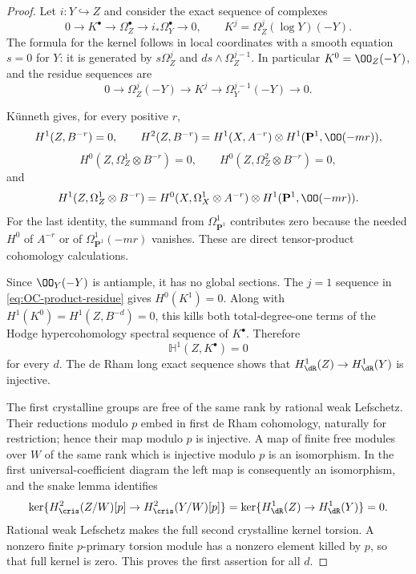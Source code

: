 \begin{proof}
Let $i:Y\hookrightarrow Z$ and consider the exact sequence of complexes
\[
 0\longrightarrow K^\bullet
 \longrightarrow\Omega_Z^\bullet
 \longrightarrow i_*\Omega_Y^\bullet\longrightarrow0,
 \qquad K^j=\Omega_Z^j(\log Y)(-Y).
\]
The formula for the kernel follows in local coordinates with a smooth equation $s=0$ for $Y$: it is generated by $s\Omega_Z^j$ and $ds\wedge\Omega_Z^{j-1}$.  In particular $K^0=\OO_Z(-Y)$, and the residue sequences are
\begin{equation}\label{eq:OC-product-residue}
 0\to\Omega_Z^j(-Y)\to K^j\to\Omega_Y^{j-1}(-Y)\to0.
\end{equation}

K\"unneth gives, for every positive $r$,
\[
 H^1(Z,B^{-r})=0,\qquad
 H^2(Z,B^{-r})=H^1(X,A^{-r})\otimes H^1(\mathbf P^1,\OO(-mr)),
\]
\[
 H^0(Z,\Omega_Z^1\otimes B^{-r})=0,
 \qquad H^0(Z,\Omega_Z^2\otimes B^{-r})=0,
\]
and
\begin{equation}\label{eq:OC-product-omega-H1}
 H^1(Z,\Omega_Z^1\otimes B^{-r})
  =H^0(X,\Omega_X^1\otimes A^{-r})
                 \otimes H^1(\mathbf P^1,\OO(-mr)).
\end{equation}
For the last identity, the summand from $\Omega^1_{\mathbf P^1}$ contributes zero because the needed $H^0$ of $A^{-r}$ or of $\Omega^1_{\mathbf P^1}(-mr)$ vanishes.  These are direct tensor-product cohomology calculations.

Since $\OO_Y(-Y)$ is antiample, it has no global sections.  The $j=1$ sequence in \eqref{eq:OC-product-residue} gives $H^0(K^1)=0$.  Along with $H^1(K^0)=H^1(Z,B^{-d})=0$, this kills both total-degree-one terms of the Hodge hypercohomology spectral sequence of $K^\bullet$.  Therefore
\[
                         \mathbb H^1(Z,K^\bullet)=0
\]
for every $d$.  The de Rham long exact sequence shows that
$H^1_{\dR}(Z)\to H^1_{\dR}(Y)$ is injective.

The first crystalline groups are free of the same rank by rational weak Lefschetz.  Their reductions modulo $p$ embed in first de Rham cohomology, naturally for restriction; hence their map modulo $p$ is injective.  A map of finite free modules over $W$ of the same rank which is injective modulo $p$ is an isomorphism.  In the first universal-coefficient diagram the left map is consequently an isomorphism, and the snake lemma identifies
\[
 \ker\{H^2_{\cris}(Z/W)[p]\to H^2_{\cris}(Y/W)[p]\}
    =\ker\{H^1_{\dR}(Z)\to H^1_{\dR}(Y)\}=0.
\]
Rational weak Lefschetz makes the full second crystalline kernel torsion.  A nonzero finite $p$-primary torsion module has a nonzero element killed by $p$, so that full kernel is zero.  This proves the first assertion for all $d$.


\end{proof}
